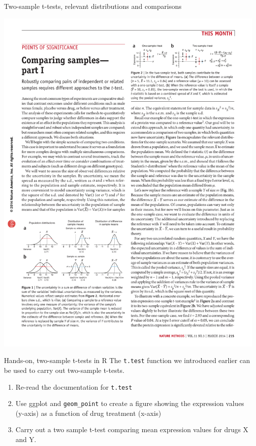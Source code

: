 \documentclass[presentation]{beamer}
\begin{document}
\begin{frame}[label={sec:org0b9d4d0}]{Two-sample t-tests, relevant distributions and comparisons}
\begin{center}
\includegraphics[height=0.30\textheight]{fig-twosample-ttest.pdf}
\end{center}

\end{frame}

\begin{frame}[fragile,label={sec:org01d311b}]{Hands-on, two-sample t-tests in R}
 The \texttt{t.test} function we introduced earlier can be used to carry out two-sample t-tests. 

\begin{enumerate}
\item Re-read the documentation for \texttt{t.test}
\item Use ggplot and \texttt{geom\_point} to create a figure showing the expression values (y-axis) as a function of drug treatment (x-axis)
\item Carry out a two sample t-test comparing mean expression values for drugs X and Y.
\end{enumerate}
\end{frame}
\end{document}
